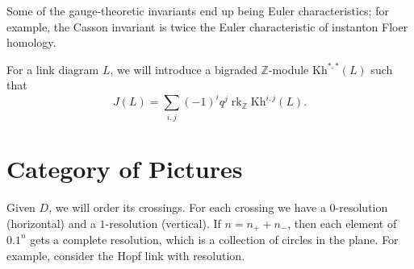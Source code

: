 \documentclass[leqno, openany]{memoir}
\theoremstyle{definition}
\theoremstyle{remark}
\theoremstyle{plain}
\theoremstyle{definition}
\theoremstyle{remark}
\newcommand{\Z}{\mathbb{Z}}
\newcommand{\mr}[1]{\mathrm{#1}}
\newcommand{\1}{\mathbf{1}}
\newcommand{\2}{\mathbf{2}}
\newcommand{\3}{\mathbf{3}}
\DeclareMathOperator{\rk}{rk}
\begin{document}
Some of the gauge-theoretic invariants end up being Euler characteristics; for example, the Casson invariant is twice the Euler characteristic of instanton Floer homology.

For a link diagram $L$, we will introduce a bigraded $\Z$-module $\mr{ Kh }^{*,*}(L)$ such that 
\[ J(L) = \sum_{i,j} {(-1)}^i q^j \rk_{\Z} \mr{ Kh }^{i,j}(L). \]

\section{Category of Pictures}%
\label{sec:category_of_pictures}

Given $D$, we will order its crossings. For each crossing we have a $0$-resolution (horizontal) and a $1$-resolution (vertical). If $n = n_+ + n_-$, then each element of $\qty{0,1}^n$ gets a complete resolution, which is a collection of circles in the plane. For example, consider the Hopf link with resolution. 
\end{document}
